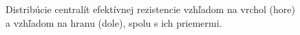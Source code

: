 \documentclass[main.tex]{subfiles}
\begin{document}
\begin{figure}
	\caption{Distribúcie centralít efektívnej rezistencie vzhľadom na vrchol (hore) a vzhľadom na hranu (dole), spolu s ich priemermi.}
	\label{fig:resistance_distr}
\end{figure}






	
\end{document}
